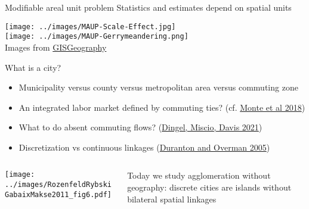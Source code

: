 \documentclass[11pt,notes=hide,aspectratio=169]{beamer}
\begin{document}
\begin{frame}{Modifiable areal unit problem}
Statistics and estimates depend on spatial units
\begin{center}
\texttt{[image: ../images/MAUP-Scale-Effect.jpg]}\\
\texttt{[image: ../images/MAUP-Gerrymeandering.png]}\\
Images from \href{https://gisgeography.com/maup-modifiable-areal-unit-problem/}{GISGeography}
\end{center}
\end{frame}
\begin{frame}{What is a city?}
\begin{itemize}
	\item Municipality versus county versus metropolitan area versus commuting zone
	\item An integrated labor market defined by commuting ties? (cf. \href{https://www.aeaweb.org/articles?id=10.1257/aer.20151507}{Monte et al 2018})
	\item What to do absent commuting flows? (\href{https://doi.org/10.1016/j.jue.2019.05.005}{Dingel, Miscio, Davis 2021})
	\item Discretization vs continuous linkages (\href{https://ideas.repec.org/a/oup/restud/v72y2005i4p1077-1106.html}{Duranton and Overman 2005})
\end{itemize}
\begin{columns}
\begin{column}{0.48\textwidth}
\hspace{5mm}
\texttt{[image: ../images/RozenfeldRybskiGabaixMakse2011\_fig6.pdf]}
\end{column}
\begin{column}{0.48\textwidth}
Today we study agglomeration without geography:
discrete cities are islands without bilateral spatial linkages
\end{column}
\end{columns}
\end{frame}
\end{document}
